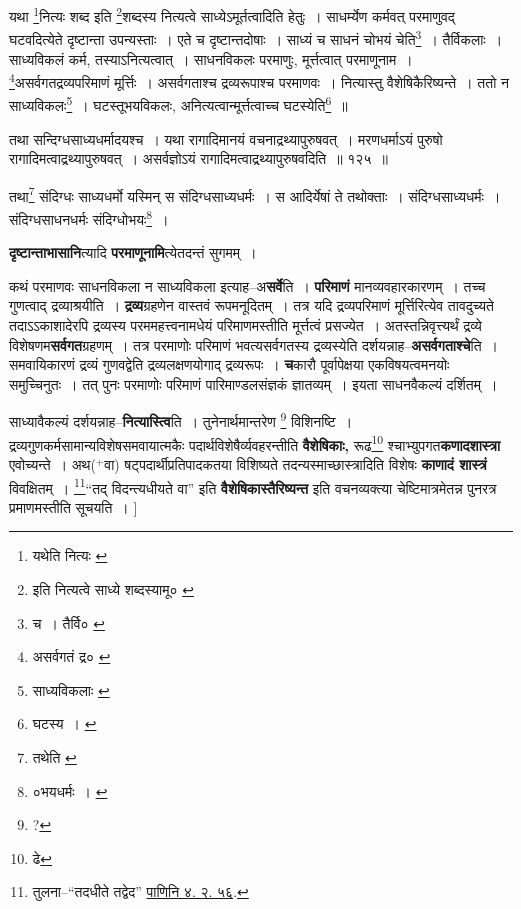 \documentclass[article,12pt,a4paper]{memoir}
\newcommand{\add}[1]{($^{+}$#1)}
\begin{document}
	  \endgroup
	 

	  \pstart यथा \footnote{यथेति नित्यः \cite{dp-msA} \cite{dp-msB} \cite{dp-edP} \cite{dp-edH} \cite{dp-edE} \cite{dp-edN}}नित्यः शब्द इति \footnote{इति नित्यत्वे साध्ये शब्दस्यामू० \cite{dp-msD} \cite{dp-msB}}शब्दस्य नित्यत्वे साध्येऽमूर्तत्वादिति हेतुः । साधर्म्येण कर्मवत् परमाणुवद् घटवदित्येते दृष्टान्ता उपन्यस्ताः । एते च दृष्टान्तदोषाः । साध्यं च साधनं चोभयं चेति\footnote{च । तैर्वि० \cite{dp-msC}} । तैर्विकलाः । साध्यविकलं कर्म, तस्याऽनित्यत्वात् । साधनविकलः परमाणुः, मूर्त्तत्वात् परमाणूनाम । \footnote{असर्वगतं द्र० \cite{dp-msA} \cite{dp-msB} \cite{dp-edP} \cite{dp-edH} \cite{dp-edN}}असर्वगतद्रव्यपरिमाणं मूर्त्तिः । असर्वगताश्च द्रव्यरूपाश्च परमाणवः । नित्यास्तु वैशेषिकैरिष्यन्ते । ततो न साध्यविकलः\footnote{साध्यविकलाः \cite{dp-msC} \cite{dp-msD}} । घटस्तूभयविकलः, अनित्यत्वान्मूर्त्तत्वाच्च घटस्येति\footnote{घटस्य । \cite{dp-edE}} ॥
	\pend
       
	  \bigskip
	  \begingroup
	

	  \pstart तथा सन्दिग्धसाध्यधर्मादयश्च । यथा रागादिमानयं वचनाद्रथ्यापुरुषवत् । मरणधर्माऽयं पुरुषो रागादिमत्वाद्रथ्यापुरुषवत् । असर्वज्ञोऽयं रागादिमत्वाद्रथ्यापुरुषवदिति ॥ १२५ ॥
	\pend
      
	  \endgroup
	 

	  \pstart तथा\footnote{तथेति \cite{dp-edE}} संदिग्धः साध्यधर्मो यस्मिन् स संदिग्धसाध्यधर्मः । स आदिर्येषां ते तथोक्ताः । संदिग्धसाध्यधर्मः । संदिग्धसाधनधर्मः संदिग्धोभयः\footnote{०भयधर्मः । \cite{dp-msC}} ।
	\pend
      
	  \endgroup
	

	  \pstart \textbf{दृष्टान्ताभासानि}त्यादि \textbf{परमाणूनामि}त्येतदन्तं सुगमम् ।
	\pend
      

	  \pstart कथं परमाणवः साधनविकला न साध्यविकला इत्याह--अ\textbf{सर्वे}ति । \textbf{परिमाणं} मानव्यवहारकारणम् । तच्च गुणत्वाद् द्रव्याश्रयीति । \textbf{द्रव्य}ग्रहणेन वास्तवं रूपमनूदितम् । तत्र यदि द्रव्यपरिमाणं मूर्त्तिरित्येव तावदुच्यते तदाऽऽकाशादेरपि द्रव्यस्य परममहत्त्वनामधेयं परिमाणमस्तीति मूर्त्तत्वं प्रसज्येत । अतस्तन्निवृत्त्यर्थं द्रव्ये विशेषणम\textbf{सर्वगत}ग्रहणम् । तत्र परमाणोः परिमाणं भवत्यसर्वगतस्य द्रव्यस्येति दर्शयन्नाह--\textbf{असर्वगताश्चे}ति । समवायिकारणं द्रव्यं गुणवद्वेति द्रव्यलक्षणयोगाद् द्रव्यरूपः । \textbf{च}कारौ पूर्वापेक्षया एकविषयत्वमनयोः समुच्चिनुतः । तत् पुनः परमाणोः परिमाणं पारिमाण्डलसंज्ञकं ज्ञातव्यम् । इयता साधनवैकल्यं दर्शितम् ।
	\pend
      

	  \pstart साध्यावैकल्यं दर्शयन्नाह--\textbf{नित्यास्त्वि}ति । तुनेनार्थमान्तरेण \footnote{?} विशिनष्टि । द्रव्यगुणकर्मसामान्यविशेषसमवायात्मकैः पदार्थविशेषैर्व्यवहरन्तीति \textbf{वैशेषिकाः,} रूढ\footnote{ढे} श्चाभ्युपगत\textbf{कणादशास्त्रा} एवोच्यन्ते । अथ\add{वा} षट्पदार्थीप्रतिपादकतया विशिष्यते तदन्यस्माच्छास्त्रादिति विशेषः \textbf{काणादं शास्त्रं} विवक्षितम् । \footnote{तुलना--“तदधीते तद्वेद” \href{http://http://sarit.indology.info/?cref=Pā.4.3.59}{पाणिनि ४. २. ५६}.}“तद् विदन्त्यधीयते वा” इति \textbf{वैशेषिकास्तैरिष्यन्त} इति वचनव्यक्त्या चेष्टिमात्रमेतन्न पुनरत्र प्रमाणमस्तीति सूचयति ।
	\pend
      [[दिति साध्य० \cite{dp-msB} \cite{dp-edP} \cite{dp-edH} \cite{dp-edE} \cite{dp-edN}]]\leavevmode{}
	  \bigskip
	  \begingroup
	
\end{document}
